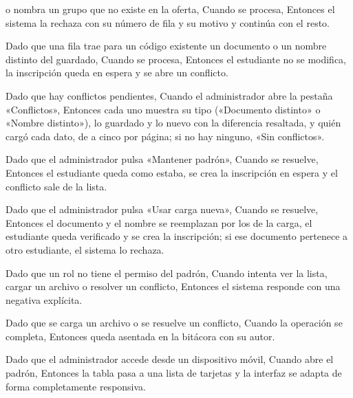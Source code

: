 {      o nombra un grupo que no existe en la oferta, Cuando se procesa, Entonces el
      sistema la rechaza con su número de fila y su motivo y continúa con el resto.
\item Dado que una fila trae para un código existente un documento o un nombre distinto
      del guardado, Cuando se procesa, Entonces el estudiante no se modifica, la
      inscripción queda en espera y se abre un conflicto.
\item Dado que hay conflictos pendientes, Cuando el administrador abre la pestaña
      «Conflictos», Entonces cada uno muestra su tipo («Documento distinto» o «Nombre
      distinto»), lo guardado y lo nuevo con la diferencia resaltada, y quién cargó cada
      dato, de a cinco por página; si no hay ninguno, «Sin conflictos».
\item Dado que el administrador pulsa «Mantener padrón», Cuando se resuelve, Entonces el
      estudiante queda como estaba, se crea la inscripción en espera y el conflicto sale
      de la lista.
\item Dado que el administrador pulsa «Usar carga nueva», Cuando se resuelve, Entonces el
      documento y el nombre se reemplazan por los de la carga, el estudiante queda
      verificado y se crea la inscripción; si ese documento pertenece a otro estudiante,
      el sistema lo rechaza.
\item Dado que un rol no tiene el permiso del padrón, Cuando intenta ver la lista, cargar
      un archivo o resolver un conflicto, Entonces el sistema responde con una negativa
      explícita.
\item Dado que se carga un archivo o se resuelve un conflicto, Cuando la operación se
      completa, Entonces queda asentada en la bitácora con su autor.
\item Dado que el administrador accede desde un dispositivo móvil, Cuando abre el padrón,
      Entonces la tabla pasa a una lista de tarjetas y la interfaz se adapta de forma
      completamente responsiva.}


